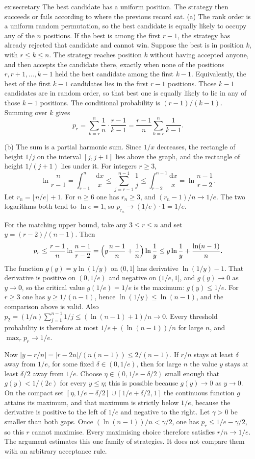 \begin{solution}{ex:secretary}
\idea The best candidate has a uniform position. The strategy then succeeds or fails according to where the previous record sat.
\writeup (a) The rank order is a uniform random permutation, so the best candidate is equally likely to occupy any of the $n$ positions. If the best is among the first $r-1$, the strategy has already rejected that candidate and cannot win. Suppose the best is in position $k$, with $r\le k\le n$. The strategy reaches position $k$ without having accepted anyone, and then accepts the candidate there, exactly when none of the positions $r,r+1,\ldots,k-1$ held the best candidate among the first $k-1$. Equivalently, the best of the first $k-1$ candidates lies in the first $r-1$ positions. Those $k-1$ candidates are in random order, so that best one is equally likely to lie in any of those $k-1$ positions. The conditional probability is $(r-1)/(k-1)$. Summing over $k$ gives
\[
 p_r=\sum_{k=r}^n\frac1n\cdot\frac{r-1}{k-1}=\frac{r-1}n\sum_{k=r}^n\frac1{k-1}.
\]

(b) The sum is a partial harmonic sum. Since $1/x$ decreases, the rectangle of height $1/j$ on the interval $[j,j+1]$ lies above the graph, and the rectangle of height $1/(j+1)$ lies under it. For integers $r\ge3$,
\[
 \ln\frac{n}{r-1}
 =\int_{r-1}^{n}\frac{\mathrm dx}x
 \le\sum_{j=r-1}^{n-1}\frac1j
 \le\int_{r-2}^{n-1}\frac{\mathrm dx}x
 =\ln\frac{n-1}{r-2}.
\]
Let $r_n=\lfloor n/e\rfloor+1$. For $n\ge6$ one has $r_n\ge3$, and $(r_n-1)/n\to1/e$. The two logarithms both tend to $\ln e=1$, so $p_{r_n}\to(1/e)\cdot1=1/e$.

For the matching upper bound, take any $3\le r\le n$ and set $y=(r-2)/(n-1)$. Then
\[
 p_r\le\frac{r-1}n\ln\frac{n-1}{r-2}
 =\Bigl(y\frac{n-1}n+\frac1n\Bigr)\ln\frac1y
 \le y\ln\frac1y+\frac{\ln(n-1)}n.
\]
The function $g(y)=y\ln(1/y)$ on $(0,1]$ has derivative $\ln(1/y)-1$. That derivative is positive on $(0,1/e)$ and negative on $(1/e,1]$, and $g(y)\to0$ as $y\to0$, so the critical value $g(1/e)=1/e$ is the maximum: $g(y)\le1/e$. For $r\ge3$ one has $y\ge1/(n-1)$, hence $\ln(1/y)\le\ln(n-1)$, and the comparison above is valid. Also $p_2=(1/n)\sum_{j=1}^{n-1}1/j\le(\ln(n-1)+1)/n\to0$. Every threshold probability is therefore at most $1/e+(\ln(n-1))/n$ for large $n$, and $\max_r p_r\to1/e$.

Now $|y-r/n|=|r-2n|/(n(n-1))\le2/(n-1)$. If $r/n$ stays at least $\delta$ away from $1/e$, for some fixed $\delta\in(0,1/e)$, then for large $n$ the value $y$ stays at least $\delta/2$ away from $1/e$. Choose $\eta\in(0,1/e-\delta/2)$ small enough that $g(y)<1/(2e)$ for every $y\le\eta$; this is possible because $g(y)\to0$ as $y\to0$. On the compact set $[\eta,1/e-\delta/2]\cup[1/e+\delta/2,1]$ the continuous function $g$ attains its maximum, and that maximum is strictly below $1/e$, because the derivative is positive to the left of $1/e$ and negative to the right. Let $\gamma>0$ be smaller than both gaps. Once $(\ln(n-1))/n<\gamma/2$, one has $p_r\le1/e-\gamma/2$, so this $r$ cannot maximise. Every maximising choice therefore satisfies $r/n\to1/e$. The argument estimates this one family of strategies. It does not compare them with an arbitrary acceptance rule.
\end{solution}

